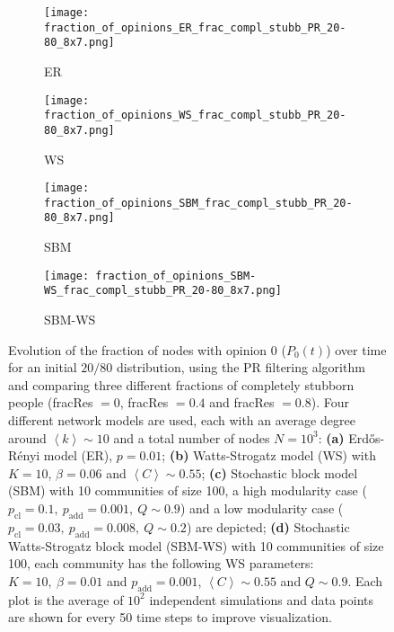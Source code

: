 \documentclass[11 pt , letterpaper , twoside , openright]{book}
\begin{document}
\begin{figure}[H]
  \begin{subfigure}[b]{0.49\textwidth}
  	\texttt{[image: fraction\_of\_opinions\_ER\_frac\_compl\_stubb\_PR\_20-80\_8x7.png]}
    \caption{ER}
  \end{subfigure}
  \begin{subfigure}[b]{0.49\textwidth}
  	\texttt{[image: fraction\_of\_opinions\_WS\_frac\_compl\_stubb\_PR\_20-80\_8x7.png]}
    \caption{WS}
  \end{subfigure}
  \begin{subfigure}[b]{0.49\textwidth}
    \texttt{[image: fraction\_of\_opinions\_SBM\_frac\_compl\_stubb\_PR\_20-80\_8x7.png]}
    \caption{SBM}
  \end{subfigure}
  \begin{subfigure}[b]{0.49\textwidth}
    \texttt{[image: fraction\_of\_opinions\_SBM-WS\_frac\_compl\_stubb\_PR\_20-80\_8x7.png]}
    \caption{SBM-WS}
  \end{subfigure}
  \captionsetup{format=plain}
  \caption[Evolution of the fraction of nodes with opinion 0 ($P_0(t)$) over time for an initial $20/80$ opinion distribution, using the PR filtering algorithm and comparing three different fractions of completely stubborn people (fracRes $= 0$, fracRes $= 0.4$ and fracRes $= 0.8$).]{Evolution of the fraction of nodes with opinion 0 ($P_0(t)$) over time for an initial $20/80$ distribution, using the PR filtering algorithm and comparing three different fractions of completely stubborn people (fracRes $= 0$, fracRes $= 0.4$ and fracRes $= 0.8$). Four different network models are used, each with an average degree around $\left<k\right> \sim 10$ and a total number of nodes $N = 10^3$: \textbf{(a)} Erd\H{o}s-R\'{e}nyi model (ER), $p=0.01$; \textbf{(b)} Watts-Strogatz model (WS) with $K = 10$, $\beta = 0.06$ and $\left<C\right> \sim 0.55$; \textbf{(c)} Stochastic block model (SBM) with 10 communities of size 100, a high modularity case ($p_{\text{cl}} = 0.1,\ p_{\text{add}} = 0.001,\ Q \sim 0.9$) and a low modularity case ($p_{\text{cl}} = 0.03,\ p_{\text{add}} = 0.008,\ Q \sim 0.2$) are depicted; \textbf{(d)} Stochastic Watts-Strogatz block model (SBM-WS) with 10 communities of size 100, each community has the following WS parameters: $K = 10,\ \beta = 0.01$ and $p_{\text{add}} = 0.001$, $\left<C\right> \sim 0.55$ and $Q \sim 0.9$. Each plot is the average of $10^2$ independent simulations and data points are shown for every 50 time steps to improve visualization.}%
\label{ev_op_20_80_stubb_PR}
\end{figure}
\end{document}
